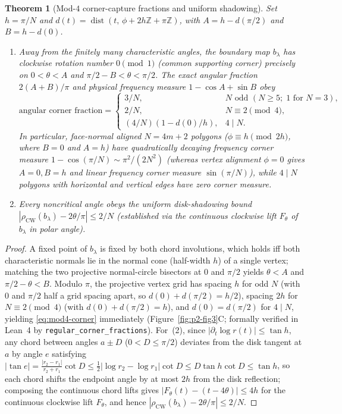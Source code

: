 \documentclass[11pt,reqno]{amsart}
\newtheorem{theorem}{Theorem}[section]
\theoremstyle{definition}
\theoremstyle{remark}
\newcommand{\Z}{\mathbb{Z}}
\DeclareMathOperator{\dist}{dist}
\begin{document}
\begin{theorem}[Mod-$4$ corner-capture fractions and uniform shadowing]\label{thm:corner-shadow}
Set $h = \pi/N$ and $d(t) = \dist(t,\, \phi + 2h\Z + \pi\Z)$, with $A = h - d(\pi/2)$ and $B = h - d(0)$.
\begin{enumerate}
  \item Away from the finitely many characteristic angles, the boundary map $b_\lambda$ has clockwise rotation number $0 \pmod 1$ (common supporting corner) precisely on $0 < \theta < A$ and $\pi/2 - B < \theta < \pi/2$. The exact angular fraction $2(A+B)/\pi$ and physical frequency measure $1 - \cos A + \sin B$ obey
  \begin{equation}\label{eq:mod4-corner}
    \text{angular corner fraction} =
    \begin{cases}
      3/N, & N \text{ odd } (N \ge 5;\; 1 \text{ for } N=3), \\
      2/N, & N \equiv 2 \pmod 4, \\
      (4/N)(1 - d(0)/h), & 4 \mid N.
    \end{cases}
  \end{equation}
  In particular, face-normal aligned $N = 4m+2$ polygons ($\phi \equiv h \pmod{2h}$, where $B = 0$ and $A = h$) have quadratically decaying frequency corner measure $1 - \cos(\pi/N) \sim \pi^2/(2N^2)$ (whereas vertex alignment $\phi = 0$ gives $A = 0, B = h$ and linear frequency corner measure $\sin(\pi/N)$), while $4\mid N$ polygons with horizontal and vertical edges have zero corner measure.
  \item Every noncritical angle obeys the uniform disk-shadowing bound $|\rho_{\mathrm{CW}}(b_\lambda) - 2\theta/\pi| \le 2/N$ (established via the continuous clockwise lift $F_\theta$ of $b_\lambda$ in polar angle).
\end{enumerate}
\end{theorem}

\begin{proof}
A fixed point of $b_\lambda$ is fixed by both chord involutions, which holds iff both characteristic normals lie in the normal cone (half-width $h$) of a single vertex; matching the two projective normal-circle bisectors at $0$ and $\pi/2$ yields $\theta < A$ and $\pi/2 - \theta < B$. Modulo $\pi$, the projective vertex grid has spacing $h$ for odd $N$ (with $0$ and $\pi/2$ half a grid spacing apart, so $d(0) + d(\pi/2) = h/2$), spacing $2h$ for $N \equiv 2 \pmod 4$ (with $d(0) + d(\pi/2) = h$), and $d(0) = d(\pi/2)$ for $4 \mid N$, yielding \eqref{eq:mod4-corner} immediately (Figure~\ref{fig:p2-fig3}C; formally verified in Lean~4 by \texttt{regular\_corner\_fractions}). For~(2), since $|\partial_t \log r(t)| \le \tan h$, any chord between angles $a \pm D$ ($0 < D \le \pi/2$) deviates from the disk tangent at $a$ by angle $e$ satisfying $|\tan e| = \frac{|r_2 - r_1|}{r_2 + r_1}\cot D \le \frac{1}{2}|\log r_2 - \log r_1|\cot D \le D\tan h\cot D \le \tan h$, so each chord shifts the endpoint angle by at most $2h$ from the disk reflection; composing the continuous chord lifts gives $|F_\theta(t) - (t - 4\theta)| \le 4h$ for the continuous clockwise lift $F_\theta$, and hence $|\rho_{\mathrm{CW}}(b_\lambda) - 2\theta/\pi| \le 2/N$.
\end{proof}
\end{document}
